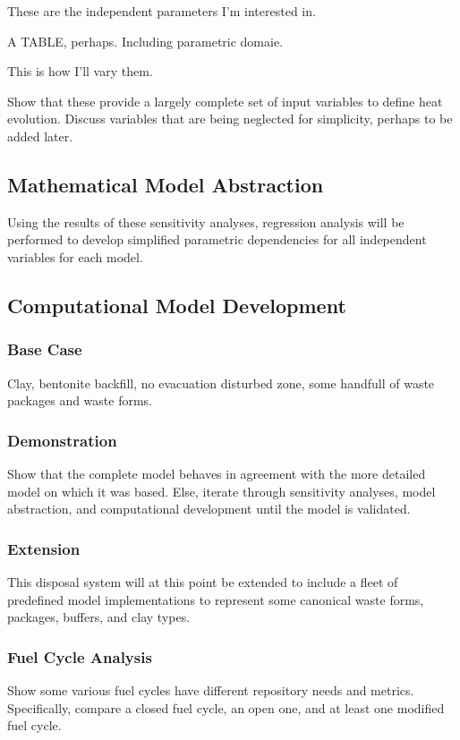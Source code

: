 These are the independent parameters I'm interested in.

A TABLE, perhaps. Including parametric domaie.

This is how I'll vary them.

Show that these provide a largely complete set of input variables to define 
heat evolution. Discuss variables that are being neglected for simplicity, 
perhaps to be added later. 

\subsection{Mathematical Model Abstraction}

Using the results of these sensitivity analyses, regression analysis will be 
performed to develop simplified parametric dependencies for all independent 
variables for each model. 

\subsection{Computational Model Development}

\subsubsection{Base Case}

Clay, bentonite backfill, no evacuation disturbed zone, some handfull of waste 
packages and waste forms.

\subsubsection{Demonstration}

Show that the complete model behaves in agreement with the more detailed model 
on which it was based. Else, iterate through sensitivity analyses, model 
abstraction, and computational development until the model is validated. 


\subsubsection{Extension}

This disposal system will at this point be extended to include a fleet of 
predefined model implementations to represent some canonical waste forms, 
packages, buffers, and clay types. 

\subsubsection{Fuel Cycle Analysis}

Show some various fuel cycles have different repository needs and metrics. 
Specifically, compare a closed fuel cycle, an open one, and at least one 
modified fuel cycle. 



